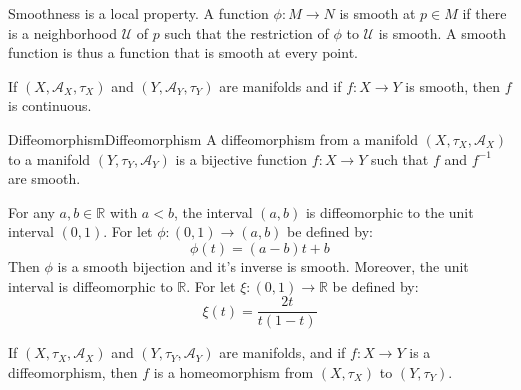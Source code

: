 \documentclass[oneside]{book}                                                  %
\begin{document}
                Smoothness is a local property. A function $\phi:M\rightarrow{N}$
                is smooth at $p\in{M}$ if there is a neighborhood
                $\mathcal{U}$ of $p$ such that the restriction of $\phi$ to
                $\mathcal{U}$ is smooth. A smooth function is thus a function
                that is smooth at every point.
                \begin{theorem}
                    If $(X,\mathcal{A}_{X},\tau_{X})$ and
                    $(Y,\mathcal{A}_{Y},\tau_{Y})$ are manifolds and if
                    $f:X\rightarrow{Y}$ is smooth, then $f$ is continuous.
                \end{theorem}
                \begin{fdefinition}{Diffeomorphism}{Diffeomorphism}
                    A diffeomorphism from a manifold
                    $(X,\tau_{X},\mathcal{A}_{X})$ to a manifold
                    $(Y,\tau_{Y},\mathcal{A}_{Y})$ is a bijective function
                    $f:X\rightarrow{Y}$ such that $f$ and $f^{\minus{1}}$ are
                    smooth.
                \end{fdefinition}
                \begin{example}
                    For any $a,b\in\mathbb{R}$ with $a<b$, the interval
                    $(a,b)$ is diffeomorphic to the unit interval $(0,1)$. For
                    let $\phi:(0,1)\rightarrow(a,b)$ be defined by:
                    \begin{equation}
                        \phi(t)=(a-b)t+b
                    \end{equation}
                    Then $\phi$ is a smooth bijection and it's inverse is
                    smooth. Moreover, the unit interval is diffeomorphic to
                    $\mathbb{R}$. For let $\xi:(0,1)\rightarrow\mathbb{R}$ be
                    defined by:
                    \begin{equation}
                        \xi(t)=\frac{2t}{t(1-t)}
                    \end{equation}
                \end{example}
                \begin{theorem}
                    If $(X,\tau_{X},\mathcal{A}_{X})$ and
                    $(Y,\tau_{Y},\mathcal{A}_{Y})$ are manifolds, and if
                    $f:X\rightarrow{Y}$ is a diffeomorphism, then $f$ is a
                    homeomorphism from $(X,\tau_{X})$ to $(Y,\tau_{Y})$.
                \end{theorem}
\end{document}
